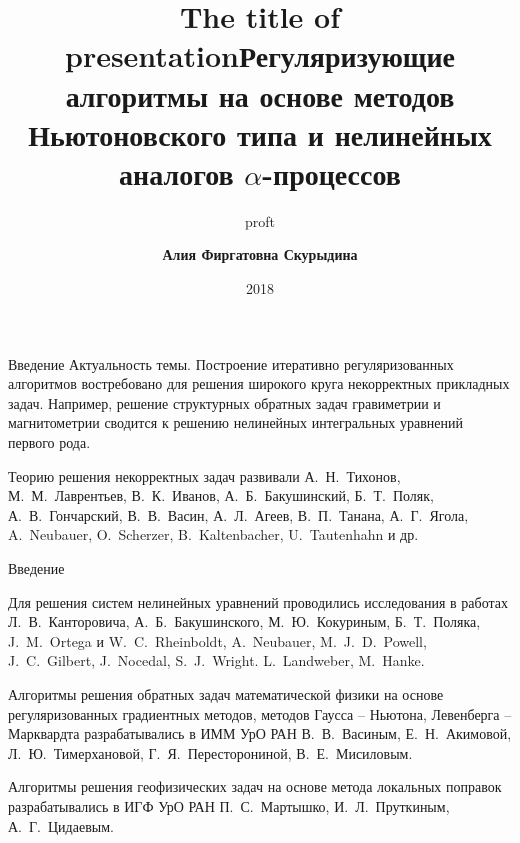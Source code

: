 \documentclass[10pt,pdf, mathserif, hyperref={unicode}]{beamer}
\title{The title of presentation}
\author{proft}
\date{2018}
\begin{document}
	
	\small
	\footnotesize
	
\title[\hspace*{55mm}{\insertpagenumber /\pageref{lastpage}}]{{\small\textbf{Регуляризующие алгоритмы на основе методов 
Ньютоновского типа и нелинейных аналогов $\alpha$-процессов}}}
\author[\insertlogo{\em{Алия Фиргатовна Скурыдина}}%
\hspace*{60mm}]{\textbf{\color{blue}Алия Фиргатовна Скурыдина}}
\frame{\titlepage}

\begin{frame}{Введение}{}
%	
	{\color{blue}Актуальность темы.} Построение итеративно регуляризованных алгоритмов востребовано для решения широкого круга некорректных прикладных задач. Например, решение структурных обратных задач гравиметрии и магнитометрии сводится к решению нелинейных интегральных уравнений первого рода.
	
	\smallskip
	Теорию решения некорректных задач развивали А.~Н.~Тихонов, М.~М.~Лаврентьев, В.~К.~Иванов, А.~Б.~Бакушинский, Б.~Т.~Поляк, А.~В.~Гончарский, В.~В.~Васин, А.~Л.~Агеев, В.~П.~Танана, А.~Г.~Ягола, A.~Neubauer, O.~Scherzer, B.~Kaltenbacher, U.~Tautenhahn и др.
	
\end{frame}

\begin{frame}{Введение}
	
	Для решения систем нелинейных уравнений проводились исследования в работах Л.~В.~Канторовича, А.~Б.~Бакушинского, М.~Ю.~Кокуриным, Б.~Т.~Поляка, J.~M.~Ortega и W.~C.~Rheinboldt,	A.~Neubauer, M.~J.~D.~Powell, 	J.~C.~Gilbert, J.~Nocedal, S.~J.~Wright.
	L.~Landweber, M.~Hanke. %
	\vspace*{0.3cm}
	
	Алгоритмы решения обратных задач математической физики на основе регуляризованных градиентных методов, 
методов Гаусса -- Ньютона, Левенберга -- Марквардта разрабатывались в ИММ УрО РАН В.~В.~Васиным, Е.~Н.~Акимовой, 
Л.~Ю.~Тимерхановой, Г.~Я.~Пересторониной, В.~Е.~Мисиловым. 
	\vspace*{0.3cm}

Алгоритмы решения геофизических задач на основе метода локальных поправок разрабатывались в ИГФ УрО РАН 
П.~С.~Мартышко, И.~Л.~Пруткиным, А.~Г.~Цидаевым.  
\end{frame}
\end{document}
